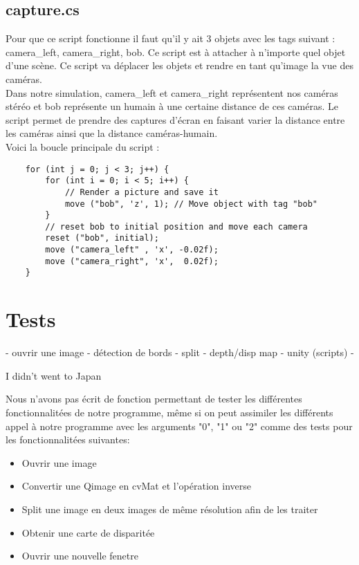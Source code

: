 \documentclass[a4paper]{article}
\begin{document}
\subsection*{capture.cs}

Pour que ce script fonctionne il faut qu'il y ait 3 objets avec les tags suivant :
camera\_left, camera\_right, bob. Ce script est à attacher à n'importe quel objet
d'une scène. Ce script va déplacer les objets et rendre en tant qu'image la vue des
caméras. \\
Dans notre simulation, camera\_left et camera\_right représentent nos caméras stéréo
et bob représente un humain à une certaine distance de ces caméras. Le script
permet de prendre des captures d'écran en faisant varier la distance entre les caméras
ainsi que la distance caméras-humain. \\
Voici la boucle principale du script :
\begin{verbatim}
	for (int j = 0; j < 3; j++) {
		for (int i = 0; i < 5; i++) {
			// Render a picture and save it
			move ("bob", 'z', 1); // Move object with tag "bob"
		}
		// reset bob to initial position and move each camera
		reset ("bob", initial);
		move ("camera_left" , 'x', -0.02f);
		move ("camera_right", 'x',  0.02f);
	}
\end{verbatim}



\section{Tests}

- ouvrir une image
- détection de bords
- split
- depth/disp map
- unity (scripts)
-

I didn't went to Japan

Nous n'avons pas écrit de fonction permettant de tester les différentes fonctionnalitées de notre programme, même si on peut assimiler les différents appel à notre programme avec les arguments "0", "1" ou "2" comme des tests pour les fonctionnalitées suivantes:
\begin{itemize}
\item Ouvrir une image
\item Convertir une Qimage en cvMat et l'opération inverse
\item Split une image en deux images de même résolution afin de les traiter
\item Obtenir une carte de disparitée
\item Ouvrir une nouvelle fenetre

\end{itemize}
\end{document}

